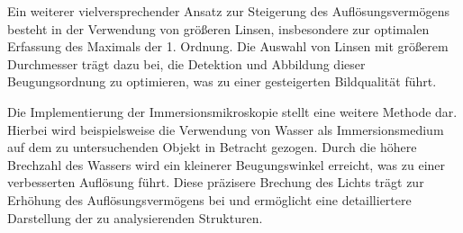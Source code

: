         Ein weiterer vielversprechender Ansatz zur Steigerung des Auflösungsvermögens besteht in der Verwendung von größeren Linsen, insbesondere zur optimalen Erfassung des Maximals der 1. Ordnung. Die Auswahl von Linsen mit größerem Durchmesser trägt dazu bei, die Detektion und Abbildung dieser Beugungsordnung zu optimieren, was zu einer gesteigerten Bildqualität führt.

        Die Implementierung der Immersionsmikroskopie stellt eine weitere Methode dar. Hierbei wird beispielsweise die Verwendung von Wasser als Immersionsmedium auf dem zu untersuchenden Objekt in Betracht gezogen. Durch die höhere Brechzahl des Wassers wird ein kleinerer Beugungswinkel erreicht, was zu einer verbesserten Auflösung führt. Diese präzisere Brechung des Lichts trägt zur Erhöhung des Auflösungsvermögens bei und ermöglicht eine detailliertere Darstellung der zu analysierenden Strukturen.

